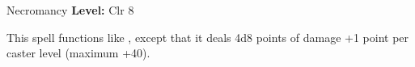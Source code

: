 {Necromancy}
{
	\textbf{Level:}
	Clr 8\\
}
{
	This spell functions like , except that it deals 4d8 points of damage +1 point per caster level (maximum +40).

}
